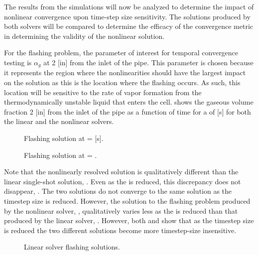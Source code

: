 The results from the simulations will now be analyzed to determine the impact of nonlinear convergence upon time-step size sensitivity.
The solutions produced by both solvers will be compared to determine the efficacy of the convergence metric in determining the validity of the nonlinear solution.

For the flashing problem, the parameter of interest for temporal convergence testing is $\alpha_g$ at 2 [in] from the inlet of the pipe.
This parameter is chosen because it represents the region where the nonlinearities should have the largest impact on the solution as this is the location where the flashing occurs.
As such, this location will be sensitive to the rate of vapor formation from the thermodynamically unstable liquid that enters the cell.
 shows the gaseous volume fraction 2 [in] from the inlet of the pipe as a function of time for a \dtmax{} of  [s] for both the linear and the nonlinear solvers.

\begin{figure}[h!tb]
\centering

\caption{Flashing solution at \dtmax{} =  {[s]}.}
\label{fig:flashing1pt0000em0}
\end{figure}

\begin{figure}[h!tb]
\centering

\caption{Flashing solution at \dtmax{} = .}
\label{fig:flashing1pt0000em5}
\end{figure}

Note that the nonlinearly resolved solution is qualitatively different than the linear single-shot solution, .
Even as the \dtmax{} is reduced, this discrepancy does not disappear, .
The two solutions do not converge to the same solution as the timestep size is reduced.
However, the solution to the flashing problem produced by the nonlinear solver, , qualitatively varies less as the \dtmax{} is reduced than that produced by the linear solver, .
However, both  and  show that as the timestep size is reduced the two different solutions become more timestep-size insensitive.

\begin{figure}[h!tb]
\centering

\caption{Linear solver flashing solutions.}
\label{fig:flashingAlphaLin}
\end{figure}

